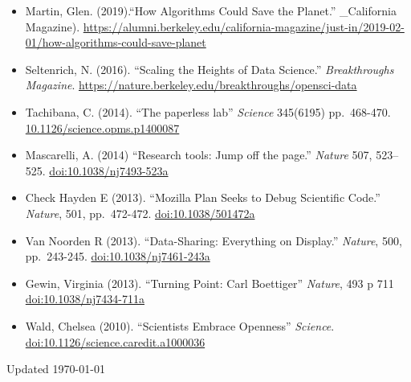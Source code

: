 \documentclass[10pt,sans]{moderncv}        %
\providecommand{\tightlist}{%
    \setlength{\itemsep}{0pt}\setlength{\parskip}{0pt}}
\begin{document}
\begin{itemize}
\tightlist
\item
  Martin, Glen. (2019).``How Algorithms Could Save the Planet.''
  \_California Magazine).
  \url{https://alumni.berkeley.edu/california-magazine/just-in/2019-02-01/how-algorithms-could-save-planet}
\item
  Seltenrich, N. (2016). ``Scaling the Heights of Data Science.''
  \emph{Breakthroughs Magazine}.
  \url{https://nature.berkeley.edu/breakthroughs/opensci-data}
\item
  Tachibana, C. (2014). ``The paperless lab'' \emph{Science} 345(6195)
  pp.~468-470.
  \href{http://www.sciencemag.org/site/products/lst_20140613.xhtml}{10.1126/science.opms.p1400087}
\item
  Mascarelli, A. (2014) ``Research tools: Jump off the page.''
  \emph{Nature} 507, 523--525.
  \href{http://dx.doi.org/10.1038/nj7493-523a}{doi:10.1038/nj7493-523a}
\item
  Check Hayden E (2013). ``Mozilla Plan Seeks to Debug Scientific
  Code.'' \emph{Nature}, 501, pp.~472-472.
  \href{http://dx.doi.org/10.1038/501472a}{doi:10.1038/501472a}
\item
  Van Noorden R (2013). ``Data-Sharing: Everything on Display.''
  \emph{Nature}, 500, pp.~243-245.
  \href{http://dx.doi.org/10.1038/nj7461-243a}{doi:10.1038/nj7461-243a}
\item
  Gewin, Virginia (2013). ``Turning Point: Carl Boettiger''
  \emph{Nature}, 493 p 711
  \href{http://dx.doi.org/10.1038/nj7434-711a}{doi:10.1038/nj7434-711a}
\item
  Wald, Chelsea (2010). ``Scientists Embrace Openness'' \emph{Science}.
  \href{http://dx.doi.org/10.1126/science.caredit.a1000036}{doi:10.1126/science.caredit.a1000036}
\end{itemize}

\vfill
Updated \today
\end{document}
